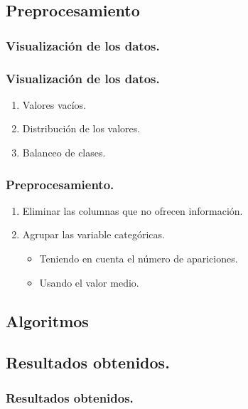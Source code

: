 \documentclass{beamer}
\theoremstyle{plain}
\theoremstyle{definition}
\theoremstyle{plain}
\theoremstyle{definition}
\theoremstyle{remark}
\theoremstyle{definition}
\begin{document}
\subsection{Preprocesamiento}
\begin{frame}
	\frametitle{Visualización de los datos.}
\end{frame}
\begin{frame}
	\frametitle{Visualización de los datos.}
	\begin{enumerate}
		\item Valores vacíos.
		\item Distribución de los valores.
		\item Balanceo de clases.
	\end{enumerate}
\end{frame}
\begin{frame}
	\frametitle{Preprocesamiento.}
	\begin{enumerate}
		\item Eliminar las columnas que no ofrecen información.
		\item Agrupar las variable categóricas.
		\begin{itemize}
			\item Teniendo en cuenta el número de apariciones.
			\item Usando el valor medio.
		\end{itemize}
\end{enumerate}
\end{frame}
\subsection{Algoritmos}
	\begin{frame}
	
	\end{frame}
\subsection{Resultados obtenidos.}
\begin{frame}
	\frametitle{Resultados obtenidos.}
\end{frame}
\end{document}
